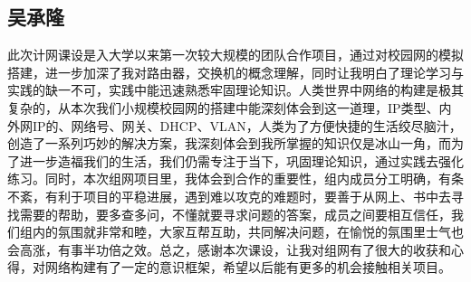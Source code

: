 	\subsection*{吴承隆}
	此次计网课设是入大学以来第一次较大规模的团队合作项目，通过对校园网的模拟搭建，进一步加深了我对路由器，交换机的概念理解，同时让我明白了理论学习与实践的缺一不可，实践中能迅速熟悉牢固理论知识。人类世界中网络的构建是极其复杂的，从本次我们小规模校园网的搭建中能深刻体会到这一道理，IP类型、内外网IP的、网络号、网关、DHCP、VLAN，人类为了方便快捷的生活绞尽脑汁，创造了一系列巧妙的解决方案，我深刻体会到我所掌握的知识仅是冰山一角，而为了进一步造福我们的生活，我们仍需专注于当下，巩固理论知识，通过实践去强化练习。同时，本次组网项目里，我体会到合作的重要性，组内成员分工明确，有条不紊，有利于项目的平稳进展，遇到难以攻克的难题时，要善于从网上、书中去寻找需要的帮助，要多查多问，不懂就要寻求问题的答案，成员之间要相互信任，我们组内的氛围就非常和睦，大家互帮互助，共同解决问题，在愉悦的氛围里士气也会高涨，有事半功倍之效。总之，感谢本次课设，让我对组网有了很大的收获和心得，对网络构建有了一定的意识框架，希望以后能有更多的机会接触相关项目。

